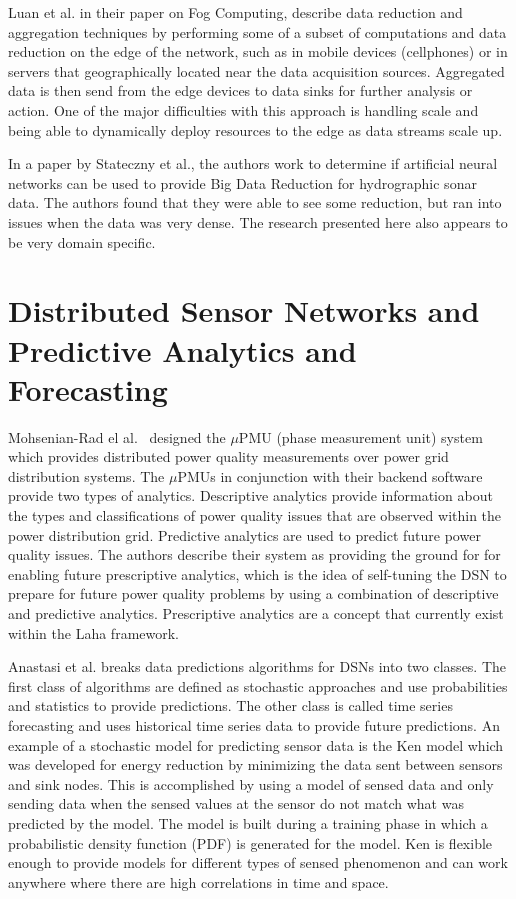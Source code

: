 Luan et al.\cite{luan2015fog} in their paper on Fog Computing, describe data reduction and aggregation techniques by performing some of a subset of computations and data reduction on the edge of the network, such as in mobile devices (cellphones) or in servers that geographically located near the data acquisition sources. Aggregated data is then send from the edge devices to data sinks for further analysis or action. One of the major difficulties with this approach is handling scale and being able to dynamically deploy resources to the edge as data streams scale up.

In a paper by Stateczny et al.\cite{stateczny2014self}, the authors work to determine if artificial neural networks can be used to provide Big Data Reduction for hydrographic sonar data. The authors found that they were able to see some reduction, but ran into issues when the data was very dense. The research presented here also appears to be very domain specific.

\section{Distributed Sensor Networks and Predictive Analytics and Forecasting}\label{sec:distributed-sensor-networks-and-predictive-analytics-and-forecasting}

Mohsenian-Rad el al.~\cite{mohsenian2018distribution} designed the $\mu$PMU (phase measurement unit) system which provides distributed power quality measurements over power grid distribution systems. The $\mu$PMUs in conjunction with their backend software provide two types of analytics. Descriptive analytics provide information about the types and classifications of power quality issues that are observed within the power distribution grid. Predictive analytics are used to predict future power quality issues. The authors describe their system as providing the ground for for enabling future prescriptive analytics, which is the idea of self-tuning the DSN to prepare for future power quality problems by using a combination of descriptive and predictive analytics. Prescriptive analytics are a concept that currently exist within the Laha framework.

Anastasi et al.\cite{anastasi_energy_2009} breaks data predictions algorithms for DSNs into two classes. The first class of algorithms are defined as stochastic approaches and use probabilities and statistics to provide predictions. The other class is called time series forecasting and uses historical time series data to provide future predictions. An example of a stochastic model for predicting sensor data is the Ken model\cite{chu2006approximate} which was developed for energy reduction by minimizing the data sent between sensors and sink nodes. This is accomplished by using a model of sensed data and only sending data when the sensed values at the sensor do not match what was predicted by the model. The model is built during a training phase in which a probabilistic density function (PDF) is generated for the model. Ken is flexible enough to provide models for different types of sensed phenomenon and can work anywhere where there are high correlations in time and space.

